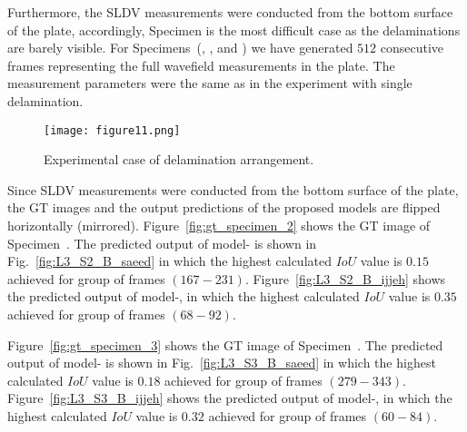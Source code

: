 Furthermore, the SLDV measurements were conducted from the bottom surface of the plate, accordingly, Specimen  is the most difficult case as the delaminations are barely visible.
For Specimens~(, , and )  we have generated \(512\) consecutive frames representing the full wavefield measurements in the plate.
The measurement parameters were the same as in the experiment with single delamination.
\begin{figure}[!h]
	\centering
	\texttt{[image: figure11.png]}
	\caption{Experimental case of delamination arrangement.}
	\label{fig:plate_delam_arrangment}
\end{figure}

Since SLDV measurements were conducted from the bottom surface of the plate, the GT images and the output predictions of the proposed models are flipped horizontally (mirrored).
Figure~\ref{fig:gt_specimen_2} shows the GT image of Specimen~.
The predicted output of model- is shown in Fig.~\ref{fig:L3_S2_B_saeed} in which the highest calculated \(IoU\) value is \(0.15\) achieved for group of frames \((167-231)\).
Figure~\ref{fig:L3_S2_B_ijjeh} shows the predicted output of model-, in which the highest calculated \(IoU\) value is \(0.35\) achieved for group of frames \((68-92)\).

Figure~\ref{fig:gt_specimen_3} shows the GT image of Specimen~.
The predicted output of model- is shown in Fig.~\ref{fig:L3_S3_B_saeed} in which the highest calculated \(IoU\) value is \(0.18\) achieved for group of frames \((279-343)\).
Figure~\ref{fig:L3_S3_B_ijjeh} shows the predicted output of model-, in which the highest calculated \(IoU\) value is \(0.32\) achieved for group of frames \((60-84)\).

